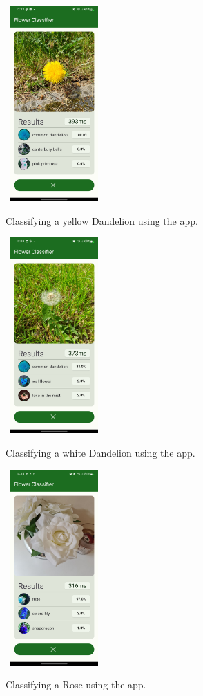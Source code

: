 \documentclass{article}
\begin{document}
\begin{figure}[h]\
    \includegraphics[width=0.3\textwidth]{dandelion.jpg}
    \caption{Classifying a yellow Dandelion using the app.}
    \label{fig:dandelion}
\end{figure}

\begin{figure}[h]\
    \includegraphics[width=0.3\textwidth]{dandelion_2.jpg}
    \caption{Classifying a white Dandelion using the app.}
    \label{fig:dandelion_2}
\end{figure}


\begin{figure}[h]\
    \includegraphics[width=0.3\textwidth]{rose.jpg}
    \caption{Classifying a Rose using the app.}
    \label{fig:rose}
\end{figure}
\end{document}
